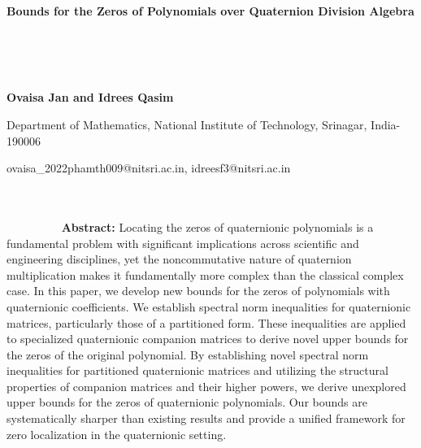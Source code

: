 \documentclass [12pt]{article}
\begin{document}
\thispagestyle{empty}
\null\vspace{-1cm}
\medskip
\vspace{1.75cm}
\centerline{\textbf{{Bounds for the Zeros of Polynomials over Quaternion Division Algebra}}}
~~~~~~~~~~~~~~~~~~~~~~~~~~~~~~~~~~~~~~~~~~~~~~~~~~~~~~~~~~~~~~~~~~~~~~~~~~~~~~~~~~~~~~~~~~~~~~~~~~~~~~~~~~~~~~~~~~~~~~~~~~~~~~~~~~~~~~~~~~~~~~~~~~~~~~~~~~~


\centerline{\bf  {Ovaisa Jan} and  {Idrees Qasim}}
\centerline {Department of Mathematics, National Institute of Technology, Srinagar, India-190006}
\centerline { ovaisa\_2022phamth009@nitsri.ac.in, idreesf3@nitsri.ac.in}
~~~~~~~~~~~~~~~~~~~~~~~~~~~~~~~~~~~~~~~~~~~~~~~~~~~~~~~~~~~~~~~~~~~~~~~~~~~~~~~~~~~~~~~~~~~~~~~~~~~~~~~~~~~~~~~~~~~~~~~~~~~~~~~~~~~~~~~~~~~~~~~~~~~~~~~~~
\vskip0.1in
\textbf{Abstract:} Locating the zeros of quaternionic polynomials is a fundamental problem with significant implications across scientific and engineering disciplines, yet the noncommutative nature of quaternion multiplication makes it fundamentally more complex than the classical complex case. In this paper, we develop new bounds for the zeros of polynomials with quaternionic coefficients. 
  We establish spectral norm inequalities for quaternionic matrices, particularly those of a partitioned form. These inequalities are applied to specialized quaternionic companion matrices to derive novel upper bounds for the zeros of the original polynomial. 
By establishing novel spectral norm inequalities for partitioned quaternionic matrices and utilizing the structural properties of companion matrices and their higher powers, we derive unexplored upper bounds for the zeros of quaternionic polynomials. Our bounds are systematically sharper than existing results and provide a unified framework for zero localization in the quaternionic setting. \\



	\vspace{0.10in}
	~~~~~~~~~~~~~~~~~~~~~~~~~~~~~~~~~~~~~~~~~~~~~~~~~~~~~~~~~~~~~~~~~~~~~~~~~~~~~~~~~~~~~~~~~~~~~~~~~~~~~~~~~~~~~~~~~~~~~~~~~~~~~~~~~~~~~~~~~~~~~~~~~~~~~~~~~
	
	\\
	\vspace{0.1in}
\end{document}
